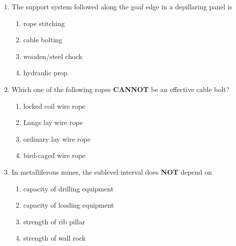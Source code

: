 \documentclass[journal]{IEEEtran}
\begin{document}
\begin{enumerate}
  \hfill{}

\item The support system followed along the goaf edge in a depillaring panel is
  \begin{enumerate}
\item rope stitching
      \item cable bolting
      \item wooden/steel chock
      \item hydraulic prop
  \end{enumerate}
  \hfill{}
\item Which one of the following ropes \textbf{CANNOT} be an effective cable bolt?
  \begin{enumerate}
\item locked coil wire rope
      \item Langs lay wire rope
      \item ordinary lay wire rope
      \item bird-caged wire rope
  \end{enumerate}
  \hfill{}
\item In metalliferous mines, the sublevel interval does \textbf{NOT} depend on
  \begin{enumerate}
\item capacity of drilling equipment
      \item capacity of loading equipment
      \item strength of rib pillar
      \item strength of wall rock
  \end{enumerate}
  \hfill{}


\end{enumerate}
\end{document}
